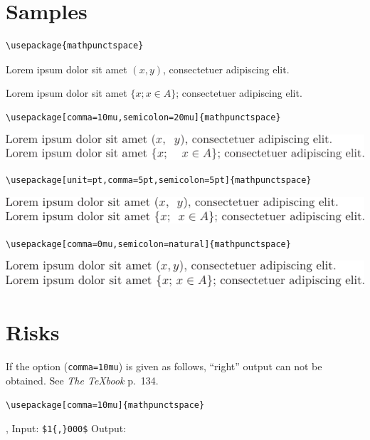 \documentclass{article}
\begin{document}
\section{Samples}

\begin{verbatim}
\usepackage{mathpunctspace}
\end{verbatim}

Lorem ipsum dolor sit amet $(x, y)$, consectetuer adipiscing elit.

Lorem ipsum dolor sit amet $\{x; x \in A\}$; consectetuer adipiscing elit.

\begin{verbatim}
\usepackage[comma=10mu,semicolon=20mu]{mathpunctspace}
\end{verbatim}

\includegraphics{comma10mu-semicolon20mu.pdf}

\begin{verbatim}
\usepackage[unit=pt,comma=5pt,semicolon=5pt]{mathpunctspace}
\end{verbatim}

\includegraphics{comma5pt-semicolon5pt.pdf}

\begin{verbatim}
\usepackage[comma=0mu,semicolon=natural]{mathpunctspace}
\end{verbatim}

\includegraphics{comma0mu-semicolonnat.pdf}

\section{Risks}

If the option (\texttt{comma=10mu}) is given as follows, ``right'' output can not be obtained. See \textit{The \TeX{}book} p.~134.

\begin{verbatim}
\usepackage[comma=10mu]{mathpunctspace}
\end{verbatim}

\begin{center}
 \hbox{,}%
 Input: \verb!$1{,}000$!\qquad
 Output: 
\end{center}
\end{document}
